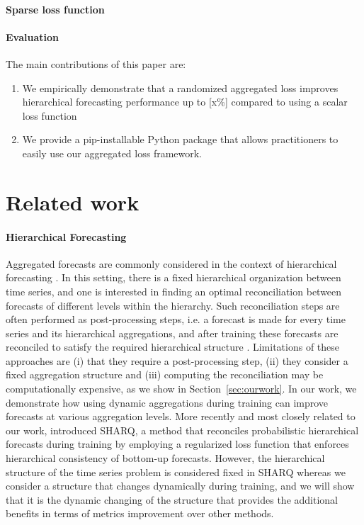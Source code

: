 \documentclass{article}
\begin{document}
  \paragraph{Sparse loss function}


  \paragraph{Evaluation}
   
   The main contributions of this paper are:
  \begin{enumerate}
    \item We empirically demonstrate that a randomized aggregated loss improves hierarchical forecasting performance up to [x\%] compared to using a scalar loss function
    \item We provide a pip-installable Python package that allows practitioners to easily use our aggregated loss framework.
  \end{enumerate}

\section{Related work}
  \label{sec:relwork}
  \paragraph{Hierarchical Forecasting} Aggregated forecasts are commonly considered in the context of hierarchical forecasting \cite{hyndman_optimal_2011}. In this setting, there is a fixed hierarchical organization between time series, and one is interested in finding an optimal reconciliation between forecasts of different levels within the hierarchy. Such reconciliation steps are often performed as post-processing steps, i.e. a forecast is made for every time series and its hierarchical aggregations, and after training these forecasts are reconciled to satisfy the required hierarchical structure \cite{hyndman_optimal_2011,  hyndman_fast_2016, taieb_coherent_2017, bentaieb_regularized_2019, wickramasuriya_optimal_2019, panagiotelis_forecast_2021}. Limitations of these approaches are (i) that they require a post-processing step, (ii) they consider a fixed aggregation structure and (iii) computing the reconciliation may be computationally expensive, as we show in Section~\ref{sec:ourwork}. In our work, we demonstrate how using dynamic aggregations during training can improve forecasts at various aggregation levels. More recently and most closely related to our work, \citet{han_simultaneously_2021} introduced SHARQ, a method that reconciles probabilistic hierarchical forecasts during training by employing a regularized loss function that enforces hierarchical consistency of bottom-up forecasts. However, the hierarchical structure of the time series problem is considered fixed in SHARQ whereas we consider a structure that changes dynamically during training, and we will show that it is the dynamic changing of the structure that provides the additional benefits in terms of metrics improvement over other methods. 
\end{document}
